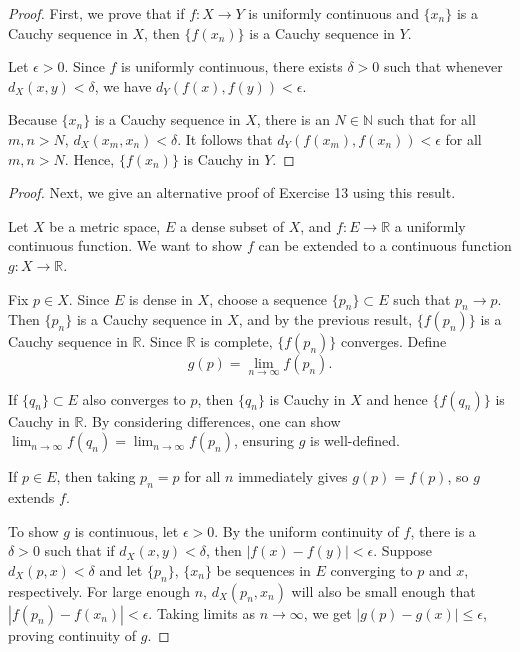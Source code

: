 \documentclass[11pt]{article}
\begin{document}
\begin{exercise}{11}
    \begin{proof}
        First, we prove that if $f: X \to Y$ is uniformly continuous and
$\{x_n\}$ is a Cauchy sequence in $X$, then $\{f(x_n)\}$ is a
Cauchy sequence in $Y$.

Let $\epsilon > 0$. Since $f$ is uniformly continuous, there exists
$\delta > 0$ such that whenever $d_X(x,y) < \delta$, we have
$d_Y(f(x), f(y)) < \epsilon$.

Because $\{x_n\}$ is a Cauchy sequence in $X$, there is an
$N \in \mathbb{N}$ such that for all $m,n > N$, $d_X(x_m, x_n) < \delta$.
It follows that $d_Y(f(x_m), f(x_n)) < \epsilon$ for all $m,n > N$.
Hence, $\{f(x_n)\}$ is Cauchy in $Y$.

\end{proof}

\begin{proof}

Next, we give an alternative proof of Exercise 13 using
this result.

Let $X$ be a metric space, $E$ a dense subset of $X$, and $f: E \to \mathbb{R}$
a uniformly continuous function. We want to show $f$ can be extended to a
continuous function $g: X \to \mathbb{R}$.

Fix $p \in X$. Since $E$ is dense in $X$, choose a sequence $\{p_n\} \subset E$
such that $p_n \to p$. Then $\{p_n\}$ is a Cauchy sequence in $X$, and by the
previous result, $\{f(p_n)\}$ is a Cauchy sequence in $\mathbb{R}$. Since
$\mathbb{R}$ is complete, $\{f(p_n)\}$ converges. Define
\[
g(p) = \lim_{n \to \infty} f(p_n).
\]

If $\{q_n\} \subset E$ also converges to $p$, then $\{q_n\}$ is Cauchy in $X$
and hence $\{f(q_n)\}$ is Cauchy in $\mathbb{R}$. By considering differences,
one can show $\lim_{n \to \infty} f(q_n) = \lim_{n \to \infty} f(p_n)$, ensuring
$g$ is well-defined.

If $p \in E$, then taking $p_n = p$ for all $n$ immediately gives $g(p) = f(p)$,
so $g$ extends $f$.

To show $g$ is continuous, let $\epsilon > 0$. By the uniform continuity of $f$,
there is a $\delta > 0$ such that if $d_X(x,y) < \delta$, then
$|f(x)-f(y)| < \epsilon$. Suppose $d_X(p,x) < \delta$ and let $\{p_n\}$, $\{x_n\}$
be sequences in $E$ converging to $p$ and $x$, respectively. For large enough $n$,
$d_X(p_n, x_n)$ will also be small enough that $|f(p_n) - f(x_n)| < \epsilon$.
Taking limits as $n \to \infty$, we get $|g(p)-g(x)| \leq \epsilon$,
proving continuity of $g$.
    \end{proof}
\end{exercise}
\end{document}
